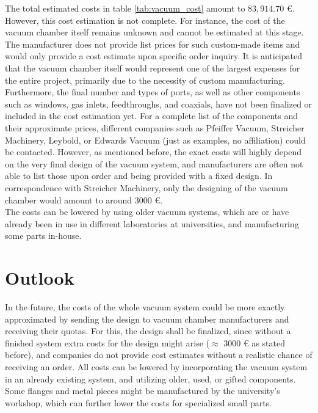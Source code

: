 The total estimated costs in table \ref{tab:vacuum_cost} amount to $83,914.70$ €. However, this cost estimation is not complete.
For instance, the cost of the vacuum chamber itself remains unknown and cannot be estimated at this stage. The manufacturer does not provide list prices for such custom-made items and would only provide a cost estimate upon specific order inquiry.
It is anticipated that the vacuum chamber itself would represent one of the largest expenses for the entire project, primarily due to the necessity of custom manufacturing.\\
Furthermore, the final number and types of ports, as well as other components such as windows, gas inlets, feedthroughs, and coaxials, have not been finalized or included in the cost estimation yet.
For a complete list of the components and their approximate prices, different companies such as Pfeiffer Vacuum, Streicher Machinery, Leybold, or Edwards Vacuum (just as examples, no affiliation) could be contacted. However, as mentioned before, the exact costs will highly depend on the very final design of the vacuum system, and manufacturers are often not able to list those upon order and being provided with a fixed design. In correspondence with Streicher Machinery, only the designing of the vacuum chamber would amount to around 3000 €.\\

The costs can be lowered by using older vacuum systems, which are or have already been in use in different laboratories at universities, and manufacturing some parts in-house.\\


\section{Outlook}

In the future, the costs of the whole vacuum system could be more exactly approximated by sending the design to vacuum chamber manufacturers and receiving their quotas. 
For this, the design shall be finalized, since without a finished system extra costs for the design might arise ($\approx$ 3000 € as stated before), and companies do not provide cost estimates without a realistic chance of receiving an order.
All costs can be lowered by incorporating the vacuum system in an already existing system, and utilizing older, used, or gifted components. 
Some flanges and metal pieces might be manufactured by the university's workshop, which can further lower the costs for specialized small parts. 





